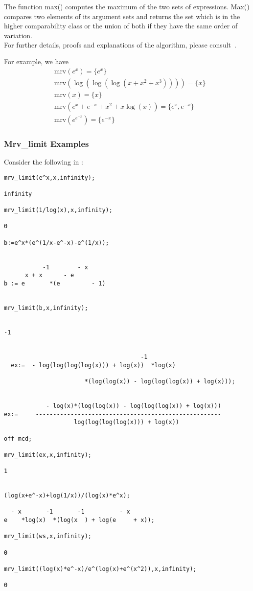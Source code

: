 The function max() computes the maximum of the two sets of expressions. Max() compares two elements of its argument sets and returns the set which is in the higher comparability class or the union of both if they have the same order of variation. \\[\baselineskip]
%
For further details, proofs and explanations of the algorithm, please consult~\cite{Gruntz:96}.

For example, we have
\begin{align*}
&\text{mrv}(e^{x})=\{e^x\} \\
&\text{mrv}(\log(\log(\log(x+x^2+x^3))))=\{x\}  \\
&\text{mrv}(x)=\{x\} \\
&\text{mrv}(e^x+e^{-x}+x^2+x \log(x))= \{e^x,e^{-x} \} \\
&\text{mrv}(e^{e^{-x}})=\{e^{-x} \}
\end{align*}

\subsubsection{Mrv\_limit Examples}
Consider the following in \REDUCE:
\begin{verbatim}
mrv_limit(e^x,x,infinity);

infinity

mrv_limit(1/log(x),x,infinity);

0

b:=e^x*(e^(1/x-e^-x)-e^(1/x));


           -1        - x
      x + x      - e
b := e       *(e         - 1)


mrv_limit(b,x,infinity);


-1


                                       -1
  ex:=  - log(log(log(log(x))) + log(x))  *log(x)

                       *(log(log(x)) - log(log(log(x)) + log(x)));


            - log(x)*(log(log(x)) - log(log(log(x)) + log(x)))
ex:=     -----------------------------------------------------
                    log(log(log(log(x))) + log(x))

off mcd;

mrv_limit(ex,x,infinity);

1


(log(x+e^-x)+log(1/x))/(log(x)*e^x);

  - x       -1       -1          - x
e    *log(x)  *(log(x  ) + log(e     + x));

mrv_limit(ws,x,infinity);

0

mrv_limit((log(x)*e^-x)/e^(log(x)+e^(x^2)),x,infinity);

0

\end{verbatim}
\normalsize
